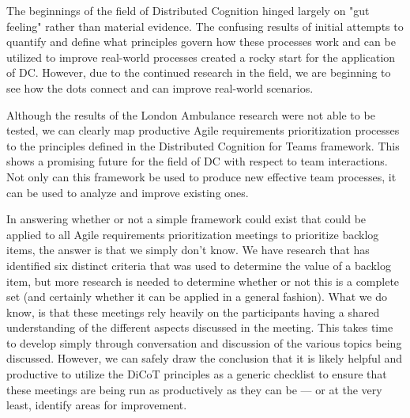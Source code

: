 The beginnings of the field of Distributed Cognition hinged largely on "gut feeling" rather than material evidence. The confusing results of initial attempts to quantify and define what principles govern how these processes work and can be utilized to improve real-world processes created a rocky start for the application of DC. However, due to the continued research in the field, we are beginning to see how the dots connect and can improve real-world scenarios.

Although the results of the London Ambulance research were not able to be tested, we can clearly map productive Agile requirements prioritization processes to the principles defined in the Distributed Cognition for Teams framework. This shows a promising future for the field of DC with respect to team interactions. Not only can this framework be used to produce new effective team processes, it can be used to analyze and improve existing ones.

In answering whether or not a simple framework could exist that could be applied to all Agile requirements prioritization meetings to prioritize backlog items, the answer is that we simply don't know. We have research that has identified six distinct criteria that was used to determine the value of a backlog item, but more research is needed to determine whether or not this is a complete set (and certainly whether it can be applied in a general fashion). What we do know, is that these meetings rely heavily on the participants having a shared understanding of the different aspects discussed in the meeting. This takes time to develop simply through conversation and discussion of the various topics being discussed. However, we can safely draw the conclusion that it is likely helpful and productive to utilize the DiCoT principles as a generic checklist to ensure that these meetings are being run as productively as they can be --- or at the very least, identify areas for improvement.
